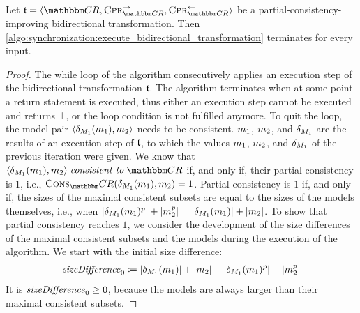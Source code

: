 \begin{lemma}
    \label{lemma:bidirectionaltransformationtermination}
    Let $\transformation{t} = \tupled{\consistencyrelationset{CR}, \consistencypreservationrule{\consistencyrelationset{CR}}^{\rightarrow}, \consistencypreservationrule{\consistencyrelationset{CR}}^{\leftarrow}}$ be a partial-consistency-improving bidirectional transformation.
    Then \autoref{algo:synchronization:execute_bidirectional_transformation} terminates for every input.
\end{lemma}
\begin{proof}
    The while loop of the algorithm consecutively applies an execution step of the bidirectional transformation $\transformation{t}$.
    The algorithm terminates when at some point a return statement is executed, thus either an execution step cannot be executed and returns $\bot$, or the loop condition is not fulfilled anymore.
    To quit the loop, the model pair $\tupled{\change{\metamodel{M}{1}}(\model{m}{1}), \model{m}{2}}$ needs to be consistent.
    $\model{m}{1}$, $\model{m}{2}$, and $\change{\metamodel{M}{1}}$ are the results of an execution step of $\transformation{t}$, to which the values $\model{m}{1}$, $\model{m}{2}$, and $\change{\metamodel{M}{1}}$ of the previous iteration were given.
    We know that $\tupled{\change{\metamodel{M}{1}}(\model{m}{1}), \model{m}{2}} \consistenttomath \consistencyrelationset{CR}$ if, and only if, their partial consistency is $1$, i.e., $\function{Cons}_\consistencyrelationset{CR}(\change{\metamodel{M}{1}}(\model{m}{1}), \model{m}{2}) = 1$.
    Partial consistency is $1$ if, and only if, the sizes of the maximal consistent subsets are equal to the sizes of the models themselves, i.e., when $\abs{\change{\metamodel{M}{1}}(\model{m}{1})^p} + \abs{\model{m}{2}^p} = \abs{\change{\metamodel{M}{1}}(\model{m}{1})} + \abs{\model{m}{2}}$.
    To show that partial consistency reaches $1$, we consider the development of the size differences of the maximal consistent subsets and the models during the execution of the algorithm.
    We start with the initial size difference:
    \begin{align*}
        \mathvariable{sizeDifference}_0 \equalsperdefinition \abs{\change{\metamodel{M}{1}}(\model{m}{1})} + \abs{\model{m}{2}} - \abs{\change{\metamodel{M}{1}}(\model{m}{1})^p} - \abs{\model{m}{2}^p}
    \end{align*}
    It is $\mathit{sizeDifference}_0 \geq 0$, because the models are always larger than their maximal consistent subsets.

\end{proof}
